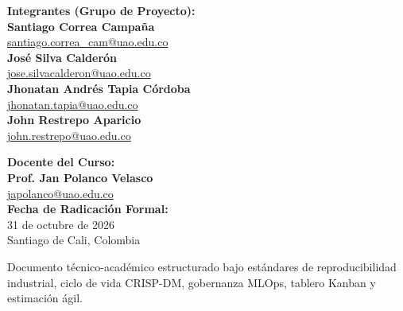 \documentclass[12pt,letterpaper]{article}
\begin{document}
\begin{titlepage}
    \begin{minipage}[t]{0.62\textwidth}
        \textbf{Integrantes (Grupo de Proyecto):}\\[0.15cm]
        \textbf{Santiago Correa Campaña}\\
        \href{mailto:santiago.correa_cam@uao.edu.co}{\footnotesize santiago.correa\_cam@uao.edu.co}\\[0.15cm]
        \textbf{José Silva Calderón}\\
        \href{mailto:jose.silvacalderon@uao.edu.co}{\footnotesize jose.silvacalderon@uao.edu.co}\\[0.15cm]
        \textbf{Jhonatan Andrés Tapia Córdoba}\\
        \href{mailto:jhonatan.tapia@uao.edu.co}{\footnotesize jhonatan.tapia@uao.edu.co}\\[0.15cm]
        \textbf{John Restrepo Aparicio}\\
        \href{mailto:john.restrepo@uao.edu.co}{\footnotesize john.restrepo@uao.edu.co}
    \end{minipage}
    \hfill
    \begin{minipage}[t]{0.35\textwidth}
        \textbf{Docente del Curso:}\\[0.15cm]
        \textbf{Prof. Jan Polanco Velasco}\\
        \href{mailto:japolanco@uao.edu.co}{japolanco@uao.edu.co}\\[0.6cm]
        \textbf{Fecha de Radicación Formal:}\\
        31 de octubre de 2026\\
        Santiago de Cali, Colombia
    \end{minipage}
    
    \vfill
    {\footnotesize Documento técnico-académico estructurado bajo estándares de reproducibilidad industrial, ciclo de vida CRISP-DM, gobernanza MLOps, tablero Kanban y estimación ágil.}
\end{titlepage}

\thispagestyle{empty}
{
  \hypersetup{linkcolor=black}
  \tableofcontents
}
\newpage
\setcounter{page}{1}

\end{document}
